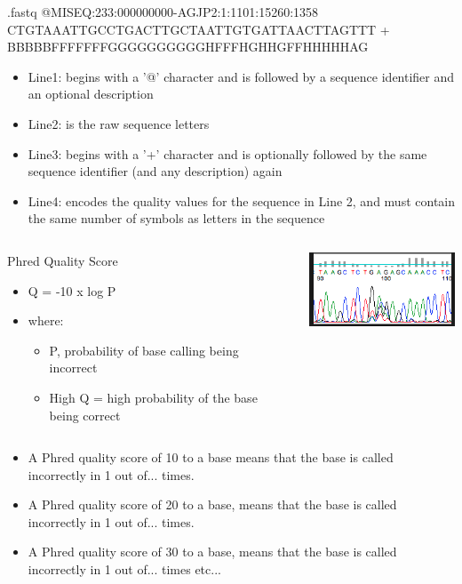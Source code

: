 \documentclass{beamer}\usepackage[]{graphicx}\usepackage[]{color}
\begin{document}
\begin{frame}
\begin{block}{.fastq}
@MISEQ:233:000000000-AGJP2:1:1101:15260:1358
CTGTAAATTGCCTGACTTGCTAATTGTGATTAACTTAGTTT \newline
+ \newline
BBBBBFFFFFFFGGGGGGGGGGHFFFHGHHGFFHHHHHAG
\end{block}
\begin{itemize}
\item Line1: \pause begins with a '@' character and is followed by a sequence identifier and an optional description 
\item Line2: \pause is the raw sequence letters 
\item Line3: \pause begins with a '+' character and is optionally followed by the same sequence identifier (and any description) again 
\item Line4: \pause encodes the quality values for the sequence in Line 2, and must contain the same number of symbols as letters in the sequence
\end{itemize}
\end{frame}

\begin{frame}
\begin{columns}
\column{6cm}
\centering
\begin{block}{Phred Quality Score}
\begin{itemize}
\item Q = -10 x log P
\item where:
\begin{itemize}
\item P, probability of base calling being incorrect
\item High Q = high probability of the base being correct
\end{itemize}
\end{itemize}
\end{block}
\column{6cm}
\centering
\includegraphics[width=5cm]{Images/phred.png}
\end{columns}
\begin{itemize}
\item A Phred quality score of 10 to a base means that the base is called incorrectly in 1 out of... times.
\item A Phred quality score of 20 to a base, means that the base is called incorrectly in 1 out of... times.
\item A Phred quality score of 30 to a base, means that the base is called incorrectly in 1 out of... times etc...
\end{itemize}
\end{frame}
\end{document}
